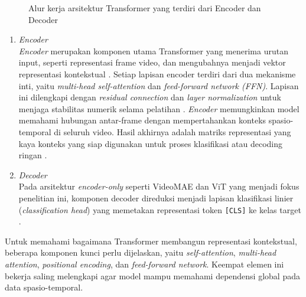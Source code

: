 \begin{figure}[H]
{{%
    }}
    \caption{Alur kerja arsitektur Transformer yang terdiri dari Encoder dan Decoder}
    \label{fig:transformer-architecture}
\end{figure}

\begin{enumerate}
	\item \textit{Encoder}\\
	\textit{Encoder} merupakan komponen utama Transformer yang menerima urutan input, seperti representasi frame video, dan mengubahnya menjadi vektor representasi kontekstual \cite{Vaswani2023}. Setiap lapisan encoder terdiri dari dua mekanisme inti, yaitu \textit{multi-head self-attention} dan \textit{feed-forward network (FFN)}. Lapisan ini dilengkapi dengan \textit{residual connection} dan \textit{layer normalization} untuk menjaga stabilitas numerik selama pelatihan \cite{IGoodfellow2016}. \textit{Encoder} memungkinkan model memahami hubungan antar-frame dengan mempertahankan konteks spasio-temporal di seluruh video. Hasil akhirnya adalah matriks representasi yang kaya konteks yang siap digunakan untuk proses klasifikasi atau decoding ringan \cite{Vaswani2023}.

	\item \textit{Decoder}\\
	Pada arsitektur \textit{encoder-only} seperti VideoMAE dan ViT yang menjadi fokus penelitian ini, komponen decoder direduksi menjadi lapisan klasifikasi linier (\textit{classification head}) yang memetakan representasi token \texttt{[CLS]} ke kelas target \cite{Dosovitskiy2021,Tong2022VideoMAE}.
\end{enumerate}

Untuk memahami bagaimana Transformer membangun representasi kontekstual, beberapa komponen kunci perlu dijelaskan, yaitu \textit{self-attention}, \textit{multi-head attention}, \textit{positional encoding}, dan \textit{feed-forward network}. Keempat elemen ini bekerja saling melengkapi agar model mampu memahami dependensi global pada data spasio-temporal.

